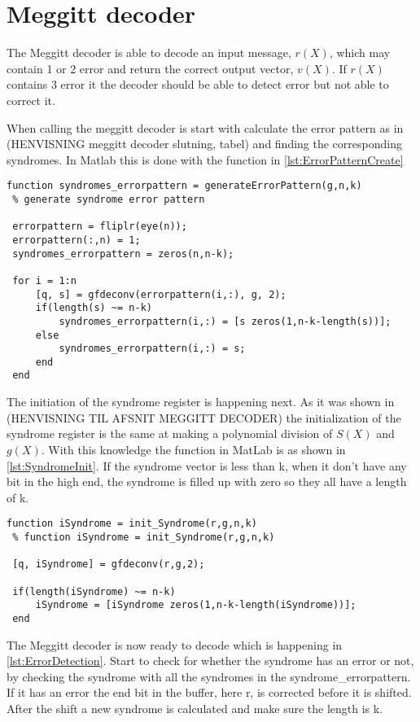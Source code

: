 \documentclass[Main]{subfiles}
\begin{document}
\section{Meggitt decoder}
The Meggitt decoder is able to decode an input message, $r(X)$, which may contain 1 or 2 error and return the correct output vector, $v(X)$.
If $r(X)$ contains 3 error it the decoder should be able to detect error but not able to correct it.

When calling the meggitt decoder is start with calculate the error pattern as in (HENVISNING meggitt decoder slutning, tabel) and finding the corresponding syndromes.
In Matlab this is done with the function in \codeTitle \ref{lst:ErrorPatternCreate}

\begin{lstlisting}[caption=Error pattern creation, style=Code-Matlab, label=lst:ErrorPatternCreate]
 function syndromes_errorpattern = generateErrorPattern(g,n,k)
 % generate syndrome error pattern
 
 errorpattern = fliplr(eye(n));
 errorpattern(:,n) = 1;
 syndromes_errorpattern = zeros(n,n-k);
 
 for i = 1:n
     [q, s] = gfdeconv(errorpattern(i,:), g, 2);
     if(length(s) ~= n-k)
         syndromes_errorpattern(i,:) = [s zeros(1,n-k-length(s))];
     else
         syndromes_errorpattern(i,:) = s;
     end
 end
\end{lstlisting}

The initiation of the syndrome register is happening next.
As it was shown in (HENVISNING TIL AFSNIT MEGGITT DECODER) the initialization of the syndrome register is the same at making a polynomial division of $S(X)$ and $g(X)$.
With this knowledge the function in MatLab is as shown in \codeTitle \ref{lst:SyndromeInit}.
If the syndrome vector is less than k, when it don't have any bit in the high end, the syndrome is filled up with zero so they all have a length of k.

\begin{lstlisting}[caption=Syndrome initialization, style=Code-Matlab, label=lst:SyndromeInit]
 function iSyndrome = init_Syndrome(r,g,n,k)
 % function iSyndrome = init_Syndrome(r,g,n,k)
 
 [q, iSyndrome] = gfdeconv(r,g,2);
 
 if(length(iSyndrome) ~= n-k)
     iSyndrome = [iSyndrome zeros(1,n-k-length(iSyndrome))];
 end
\end{lstlisting}

The Meggitt decoder is now ready to decode which is happening in \codeTitle \ref{lst:ErrorDetection}.
Start to check for whether the syndrome has an error or not, by checking the syndrome with all the syndromes in the syndrome\_errorpattern.
If it has an error the end bit in the buffer, here r, is corrected before it is shifted.
After the shift a new syndrome is calculated and make sure the length is k.
\end{document}
